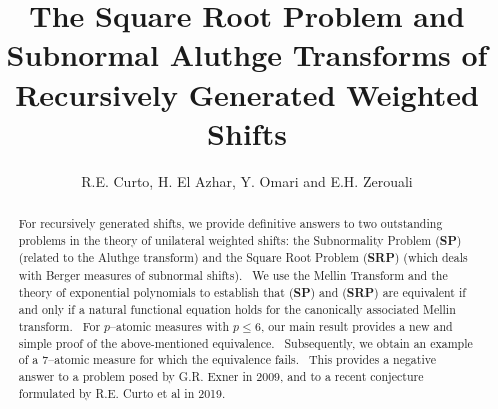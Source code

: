 \documentclass[12pt]{amsart}
\begin{document}
\title[The Square Root Problem and Subnormal Aluthge Transforms]{\bf The Square Root Problem and \\ Subnormal Aluthge Transforms of \\ Recursively Generated Weighted Shifts}
\author[R.E. Curto, H. El Azhar,  Y. Omari and E.H. Zerouali]{R.E. Curto, H. El Azhar, Y. Omari and E.H. Zerouali}
\address{R.E. Curto, Department of Mathematics, The University of Iowa, Iowa City, Iowa, U.S.A.}
\address{H. El Azhar, Faculty of
sciences, Chouaib Doukkali University, El Jadida, Morocco.}

\address{Y. Omari,  Faculty of Sciences, Ibn Tofail University, Kenitra, Morocco.}

\address{ E.H. Zerouali, Permanent address.  Laboratory of Mathematical Analysis and Applications, Faculty of Sciences, Mohammed V University in Rabat, Rabat, Morocco.}
\address{Current address: Department of Mathematics, The University of Iowa, Iowa City, Iowa, U.S.A.}
\begin{abstract} 
For recursively generated shifts, we provide definitive answers to two outstanding problems in the theory of unilateral weighted shifts: the Subnormality Problem ({\bf SP}) (related to the Aluthge transform) and the Square Root Problem ({\bf SRP}) (which deals with Berger measures of subnormal shifts). \ We use the Mellin Transform and the theory of exponential polynomials to establish that ({\bf SP}) and ({\bf SRP}) are equivalent if and only if a natural functional equation holds for the canonically associated Mellin transform. \ For $p$--atomic measures with $p \le 6$, our main result provides a new and simple proof of the above-mentioned equivalence. \ Subsequently, we obtain an example of a $7$--atomic measure for which the equivalence fails. \ This provides a negative answer to a problem posed by G.R. Exner in 2009, and to a recent conjecture formulated by R.E. Curto et al in 2019.
\end{abstract}

\maketitle
\end{document}

